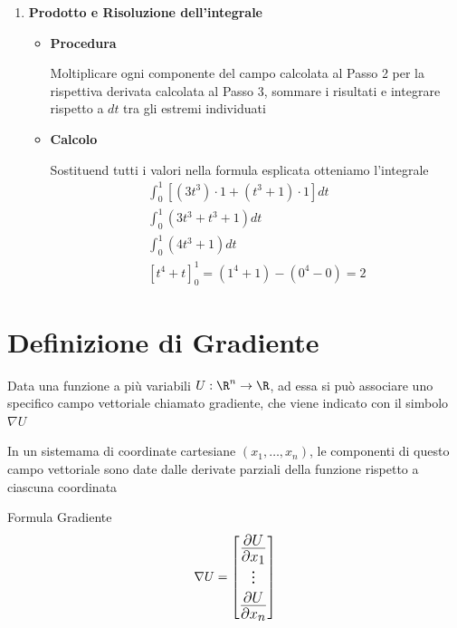 \begin{enumerate}
\begin{itemize}
                Calcolare semplicemente le derivate delle equazioni parametriche rispetto a $t$(cioè $\frac{dx}{dt}$ e $\frac{dy}{dt}$)
                \item \textbf{Calcolo}
                    \begin{gather}
                        x(t)=t \to \frac{dx}{dt} = 1 \\
                        y(t)=t \to \frac{dy}{dt} = 1
                    \end{gather}
            \end{itemize}
        
        \item \textbf{Prodotto e Risoluzione dell'integrale}
            \begin{itemize}
                \item \textbf{Procedura}

                Moltiplicare ogni componente del campo calcolata al Passo 2 per la rispettiva derivata calcolata al Passo 3, sommare i risultati e integrare rispetto a $dt$ tra gli estremi individuati
                
                \item \textbf{Calcolo}
                
                Sostituend tutti i valori nella formula esplicata otteniamo l'integrale 
                    \begin{gather}
                        \int_{0}^{1} [(3t^3)\cdot 1 + (t^3+1)\cdot 1] dt \\
                        \int_{0}^{1}(3t^3+t^3+1)dt \\
                        \int_{0}^{1}(4t^3+1)dt \\
                        [t^4+t]^{1}_{0}=(1^4+1)-(0^4-0)=2
                    \end{gather}
            \end{itemize}
    \end{enumerate}

\section{Definizione di Gradiente}
Data una funzione a più variabili $U:\R^n \to \R$, ad essa si può associare uno specifico campo vettoriale chiamato gradiente, che viene indicato con il simbolo $\nabla U$

\vspace{\baselineskip}

In un sistemama di coordinate cartesiane $(x_1, \dots , x_n)$, le componenti di questo campo vettoriale sono date dalle derivate parziali della funzione rispetto a ciascuna coordinata

\begin{definizione}{Formula Gradiente}
    $$\LARGE
        \nabla U = \begin{bmatrix}
            \frac{\partial U}{\partial x_1} \\
            \vdots \\
            \frac{\partial U}{\partial x_n}
        \end{bmatrix}
    $$
\end{definizione}